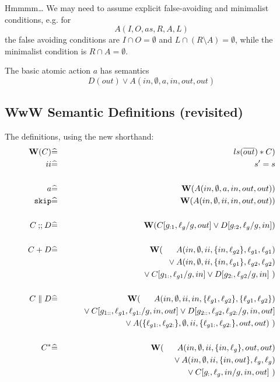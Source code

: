 Hmmmm\dots
We may need to assume explicit false-avoiding and minimalist conditions,
e.g. for
\[
   A(I,O,as,R,A,L)
\]
the false avoiding conditions are
$I \cap O = \emptyset$
and $L \cap (R \setminus A) = \emptyset$,
while the minimalist condition is $R \cap A = \emptyset$.

The basic atomic action $a$ has semantics
\[
  D(out) \lor A(in,\emptyset,a,in,out,out)
\]

\subsection{WwW Semantic Definitions (revisited)}
The definitions, using the new shorthand:
\begin{eqnarray*}
   \W(C) &\defs& ls(\B{out}) * C)
\\ ii &\defs& s'=s
\\
\\ a &\defs&\W(A(in,\emptyset,a,in,out,out))
\\ \cskip
   &\defs&
   \W(A(in,\emptyset,ii,in,out,out))
\\
\\ C \cseq D
   &\defs&
   \W(C[g_{:1},\ell_g/g,out] \lor D[g_{:2},\ell_g/g,in])
\\
\\ C + D
   &\defs&
   \W(\quad {}\phlor A(in,\emptyset,ii,\setof{in,\ell_{g2}},\ell_{g1},\ell_{g1})
\\ && \qquad {} \lor
   A(in,\emptyset,ii,\setof{in,\ell_{g1}},\ell_{g2},\ell_{g2})
\\ && \qquad {} \lor
   C[g_{1:},\ell_{g1}/g,in] \lor D[g_{2:},\ell_{g2}/g,in]~)
\\
\\ C \parallel D
   &\defs&
   \W(\quad\phlor A(in,\emptyset,ii,in,\setof{\ell_{g1},\ell_{g2}},\setof{\ell_{g1},\ell_{g2}})
\\ && \qquad {}\lor
   C[g_{1::},\ell_{g1},\ell_{g1:}/g,in,out]
   \lor D[g_{2::},\ell_{g2},\ell_{g2:}/g,in,out]
\\ && \qquad {}\lor
   A(\setof{\ell_{g1:},\ell_{g2:}},\emptyset
      ,ii
      ,\setof{\ell_{g1:},\ell_{g2:}},out,out)~)
\\
\\ C^*
   &\defs&
   \W(\quad\phlor A(in,\emptyset,ii,\setof{in,\ell_g},out,out)
\\ && \qquad {}\lor A(in,\emptyset,ii,\setof{in,out},\ell_g,\ell_g)
\\ && \qquad {}\lor C[g_{:},\ell_g,in/g,in,out]~)
\end{eqnarray*}

